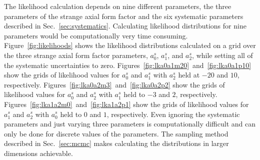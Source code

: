     The likelihood calculation depends on nine different parameters, the three
    parameters of the strange axial form factor and the six systematic
    parameters described in Sec.~\ref{sec:systematics}. Calculating likelihood
    distributions for nine parameters would be computationally very time
    consuming. Figure~\ref{fig:likelihoods} shows the likelihood distributions
    calculated on a grid over the three strange axial form factor parameters,
    $a_0^s$, $a_1^s$, and $a_2^s$, while setting all of the systematic
    uncertainties to zero. Figures~\ref{fig:lka0a1m20}~and~\ref{fig:lka0a1p10}
    show the grids of likelihood values for $a_0^s$ and $a_1^s$ with $a_2^s$
    held at $-20$ and $10$, respectively.
    Figures~\ref{fig:lka0a2m3}~and~\ref{fig:lka0a2p2} show the grids of
    likelihood values for $a_0^s$ and $a_2^s$ with $a_1^s$ held to $-3$ and
    $2$, respectively.  Figures~\ref{fig:lka1a2m0}~and~\ref{fig:lka1a2p1} show
    the grids of likelihood values for $a_1^s$ and $a_2^s$ with $a_0^s$ held to
    $0$ and $1$, respectively. Even ignoring the systematic parameters and just
    varying three parameters is computationally difficult and can only be done
    for discrete values of the parameters. The sampling method described in
    Sec.~\ref{sec:mcmc} makes calculating the distributions in larger
    dimensions achievable.
